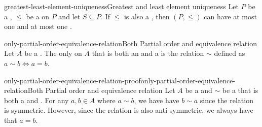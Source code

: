 \documentclass[preview]{standalone}
\begin{document}
\begin{snippetcorollary}{greatest-least-element-uniqueness}{Greatest and least element uniqueness}
    Let \(P\) be a \set, \(\leq\) be a \preorder on \(P\) and let \(S\subseteq P\).
    If \(\leq\) is also a \partialorder, then \((P, \leq)\) can have at most one \greatestelement
    and at most one \leastelement.
\end{snippetcorollary}


\begin{snippettheorem}{only-partial-order-equivalence-relation}{Both Partial order and equivalence relation}
    Let \(A\) be a \set. The only \binrelation on \(A\) that is both an
    \equivrelation and a \partialorder is the relation \(\sim\) defined as
    \(a \sim b \iff a = b\).
\end{snippettheorem}

\begin{snippetproof}{only-partial-order-equivalence-relation-proof}{only-partial-order-equivalence-relation}{Both Partial order and equivalence relation}
    Let \(A\) be a \set and \(\sim\) be a \binrelation that is both a \partialorder and \equivrelation.
    For any \(a,b\in A\) where \(a\sim b\), we have have \(b\sim a\) since the relation is symmetric.
    However, since the relation is also anti-symmetric, we always have that \(a=b\).
\end{snippetproof}
\end{document}
